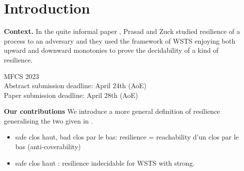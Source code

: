 \section{Introduction}\label{section introduction}


{\bf Context.} In the quite informal paper \cite{DBLP:journals/corr/PrasadZ16}, Prasad and Zuck studied resilience of a process to an adversary and they used the framework of WSTS enjoying both upward and downward monotonies to prove the decidability of a kind of resilience.

MFCS 2023 \\
Abstract submission deadline:    	April 24th (AoE) \\
Paper submission deadline:    	April 28th (AoE)


{\bf Our contributions}
We introduce a more general definition of resilience generalising the two given in \cite{DBLP:conf/gg/Ozkan22}.


\begin{itemize}

\item safe clos haut, bad clos par le bas: resilience = reachability d'un clos par le bas (anti-coverability)

\item safe clos haut : resilience indecidable for WSTS with strong.

\end{itemize}